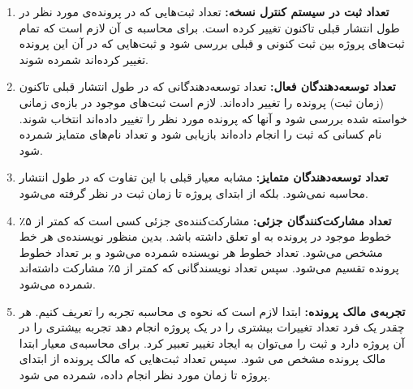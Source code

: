 \begin{enumerate}
	\item
	\textbf{تعداد ثبت در سیستم کنترل نسخه:}
	تعداد ثبت‌هایی که در  پرونده‌ی ‌مورد نظر در طول انتشار قبلی تاکنون تغییر کرده است. برای محاسبه ی آن لازم است که تمام ثبت‌های پروژه بین ثبت کنونی و  قبلی بررسی شود و ثبت‌هایی که در آن این پرونده تغییر کرده‌اند شمرده شوند.
	\item
	\textbf{تعداد توسعه‌دهندگان 
		فعال:}
	تعداد توسعه‌دهندگانی که در طول انتشار قبلی تاکنون (زمان ثبت) پرونده را تغییر داده‌اند. لازم است ثبت‌های موجود در باز‌ه‌ی زمانی خواسته شده بررسی شود و آنها که پرونده مورد نظر را تغییر داده‌اند انتخاب شوند. نام کسانی که ثبت را انجام داده‌اند بازیابی شود و تعداد نام‌های متمایز شمرده شود. 
	\item
	\textbf{تعداد توسعه‌دهندگان	متمایز:}
	مشابه معیار قبلی با این تفاوت که در طول انتشار محاسبه نمی‌شود. بلکه از ابتدای پروژه تا زمان ثبت در نظر گرفته می‌شود. 
	\item
	\textbf{تعداد مشارکت‌کنندگان جزئی:}
	مشارکت‌کننده‌ی جزئی کسی است که کمتر از ۵٪ خطوط موجود در پرونده به او تعلق داشته باشد. بدین منظور نویسنده‌ی هر خط مشخص می‌شود. تعداد خطوط هر نویسنده شمرده می‌شود و بر تعداد خطوط پرونده تقسیم می‌شود. سپس تعداد نویسندگانی که کمتر از ۵٪ مشارکت داشته‌اند شمرده می‌شود. 
\item
\textbf{تجربه‌ی مالک پرونده:}
	ابتدا لازم است که نحوه ی محاسبه تجربه را تعریف کنیم. هر چقدر یک فرد تعداد تغییرات بیشتری را در یک پروژه انجام دهد تجربه بیشتری را در آن پروژه دارد و ثبت را می‌توان به ایجاد تغییر تعبیر کرد. برای محاسبه‌ی معیار ابتدا مالک پرونده مشخص می شود. سپس تعداد ثبت‌هایی که مالک پرونده از ابتدای پروژه تا زمان مورد نظر انجام داده، شمرده می شود.
\end{enumerate}

